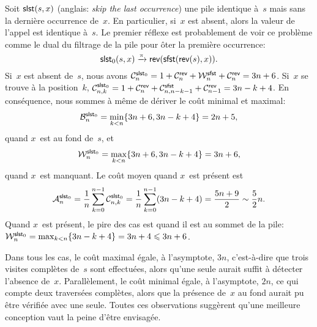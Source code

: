 Soit \(\fun{slst}(s,x)\) (anglais: \emph{skip
  the last occurrence}) une pile identique à~\(s\) mais sans la
dernière occurrence de~\(x\). En particulier, si~\(x\) est absent,
alors la valeur de l'appel est identique à~\(s\). Le premier réflexe
est probablement de voir ce problème comme le dual du filtrage de la
pile pour ôter la première occurrence:
\begin{equation}
  \fun{slst}_0(s,x) \xrightarrow{\smash{\pi}}
                  \fun{rev}(\fun{sfst}(\fun{rev}(s),x)).
\label{eq:slst0}
\end{equation}
Si~\(x\) est absent de~\(s\), nous avons
\(\C{\fun{slst}_0}{n} = 1 + \C{\fun{rev}}{n} + \W{\fun{sfst}}{n} +
\C{\fun{rev}}{n} = 3n+6\). Si~\(x\) se trouve à la position~\(k\),
\(\C{\fun{slst}_0}{n,k} = 1 + \C{\fun{rev}}{n} +
\C{\fun{sfst}}{n,n-k-1} + \C{\fun{rev}}{n-1} = 3n - k + 4\). En
conséquence, nous sommes à même de dériver le coût minimal et
maximal:
\begin{equation*}
\abovedisplayskip=0pt
\belowdisplayskip=0pt
\B{\fun{slst}_0}{n} = \min_{k < n}\{3n+6,3n-k+4\} = 2n + 5,
\end{equation*}
quand \(x\)~est au fond de~\(s\), et
\begin{equation*}
\abovedisplayskip=0pt
\belowdisplayskip=0pt
\W{\fun{slst}_0}{n} = \max_{k < n}\{3n+6,3n-k+4\} = 3n+6,
\end{equation*}
quand \(x\)~est manquant.  Le coût
moyen quand \(x\)~est présent est
\begin{equation*}
\M{\fun{slst}_0}{n} =
\frac{1}{n}\sum_{k=0}^{n-1}\C{\fun{slst}_0}{n,k} =
\frac{1}{n}\sum_{k=0}^{n-1}(3n - k + 4) = \frac{5n+9}{2} \sim
\frac{5}{2}n.
\end{equation*}
Quand \(x\)~est présent, le pire des cas est quand il est au sommet de
la pile: \(\W{\fun{slst}_0}{n} = \max_{k<n}\{3n - k + 4\} = 3 n+ 4
\leqslant 3n + 6\).

Dans tous les cas, le coût maximal égale, à l'asymptote, \(3n\),
c'est-à-dire que trois visites complètes de~\(s\) sont effectuées,
alors qu'une seule aurait suffit à détecter l'absence
de~\(x\). Parallèlement, le coût minimal égale, à l'asymptote, \(2n\),
ce qui compte deux traversées complètes, alors que la présence
de~\(x\) au fond aurait pu être vérifiée avec une seule. Toutes ces
observations suggèrent qu'une meilleure conception vaut la peine
d'être envisagée.

